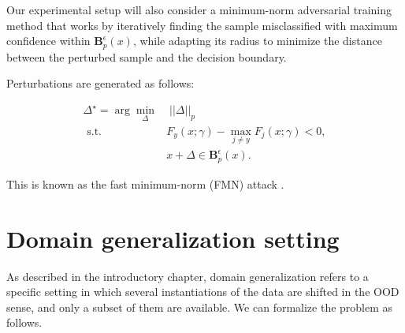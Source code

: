 Our experimental setup will also consider a minimum-norm 
adversarial training method that works by iteratively finding the 
sample misclassified with maximum confidence within $\mathbf{B}_p^\epsilon(x)$,
while adapting its radius to minimize the distance between the perturbed
sample and the decision boundary.

\begin{attack}[FMN]
    Perturbations are generated as follows:
    
    $$
        \begin{aligned}
            \Delta^\star = \arg \min_\Delta & \; ||\Delta||_p \\
            \text { s.t. } & F_y(x; \gamma)- \max_{j \neq y} F_j(x; \gamma) < 0, \\
            & x + \Delta \in \mathbf{B}_p^\epsilon(x).
        \end{aligned}
    $$

    This is known as the fast minimum-norm (FMN) attack
    \cite{pintorFastMinimumnormAdversarial2021}.
\end{attack}


\section{Domain generalization setting}

As described in the introductory chapter, domain generalization
refers to a specific setting in which several instantiations of
the data are shifted in the OOD sense, and only a subset of them
are available. We can formalize the problem as follows.


